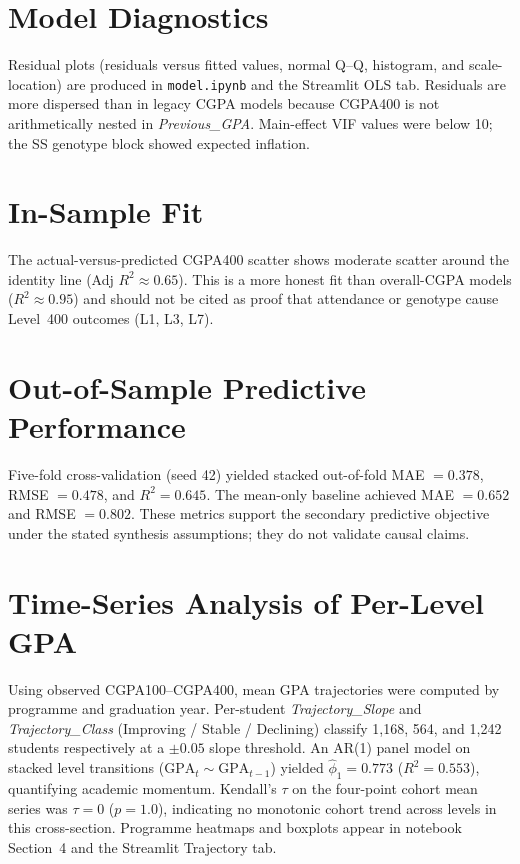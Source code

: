 \documentclass[12pt]{report}
\begin{document}
	\section{Model Diagnostics}
	Residual plots (residuals versus fitted values, normal Q--Q, histogram, and scale-location) are produced in \texttt{model.ipynb} and the Streamlit OLS tab. Residuals are more dispersed than in legacy CGPA models because CGPA400 is not arithmetically nested in \textit{Previous\_GPA}. Main-effect VIF values were below 10; the SS genotype block showed expected inflation.
	
	\section{In-Sample Fit}
	The actual-versus-predicted CGPA400 scatter shows moderate scatter around the identity line (Adj $R^2 \approx 0.65$). This is a more honest fit than overall-CGPA models ($R^2 \approx 0.95$) and should not be cited as proof that attendance or genotype cause Level~400 outcomes (L1, L3, L7).
	
	\section{Out-of-Sample Predictive Performance}
	Five-fold cross-validation (seed 42) yielded stacked out-of-fold MAE $= 0.378$, RMSE $= 0.478$, and $R^2 = 0.645$. The mean-only baseline achieved MAE $= 0.652$ and RMSE $= 0.802$. These metrics support the secondary predictive objective under the stated synthesis assumptions; they do not validate causal claims.
	
	\section{Time-Series Analysis of Per-Level GPA}
	Using observed CGPA100--CGPA400, mean GPA trajectories were computed by programme and graduation year. Per-student \textit{Trajectory\_Slope} and \textit{Trajectory\_Class} (Improving / Stable / Declining) classify 1,168, 564, and 1,242 students respectively at a $\pm 0.05$ slope threshold. An AR(1) panel model on stacked level transitions ($\text{GPA}_t \sim \text{GPA}_{t-1}$) yielded $\hat{\phi}_1 = 0.773$ ($R^2 = 0.553$), quantifying academic momentum. Kendall's $\tau$ on the four-point cohort mean series was $\tau = 0$ ($p = 1.0$), indicating no monotonic cohort trend across levels in this cross-section. Programme heatmaps and boxplots appear in notebook Section~4 and the Streamlit Trajectory tab.
	
\end{document}
